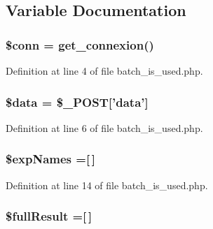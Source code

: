 \subsection{Variable Documentation}
\hypertarget{batch__is__used_8php_aa8a5a87b9c1a6a0819b88447cbe41877}{
\subsubsection[{\$conn}]{\setlength{\rightskip}{0pt plus 5cm}\$conn = {\bf get\-\_\-connexion}()}}\label{batch__is__used_8php_aa8a5a87b9c1a6a0819b88447cbe41877}


Definition at line 4 of file batch\-\_\-is\-\_\-used.\-php.

\hypertarget{batch__is__used_8php_a6efc15b5a2314dd4b5aaa556a375c6d6}{
\subsubsection[{\$data}]{\setlength{\rightskip}{0pt plus 5cm}\${\bf data} = \$\-\_\-\-P\-O\-S\-T\mbox{[}'{\bf data}'\mbox{]}}}\label{batch__is__used_8php_a6efc15b5a2314dd4b5aaa556a375c6d6}


Definition at line 6 of file batch\-\_\-is\-\_\-used.\-php.

\hypertarget{batch__is__used_8php_a8d5bac2f2b410351f073c23d51d262cf}{
\subsubsection[{\$exp\-Names}]{\setlength{\rightskip}{0pt plus 5cm}\$exp\-Names =\mbox{[}$\,$\mbox{]}}}\label{batch__is__used_8php_a8d5bac2f2b410351f073c23d51d262cf}


Definition at line 14 of file batch\-\_\-is\-\_\-used.\-php.

\hypertarget{batch__is__used_8php_a7ce9324a2e06fc9170b9dafc76465fb7}{
\subsubsection[{\$full\-Result}]{\setlength{\rightskip}{0pt plus 5cm}\$full\-Result =\mbox{[}$\,$\mbox{]}}}\label{batch__is__used_8php_a7ce9324a2e06fc9170b9dafc76465fb7}


